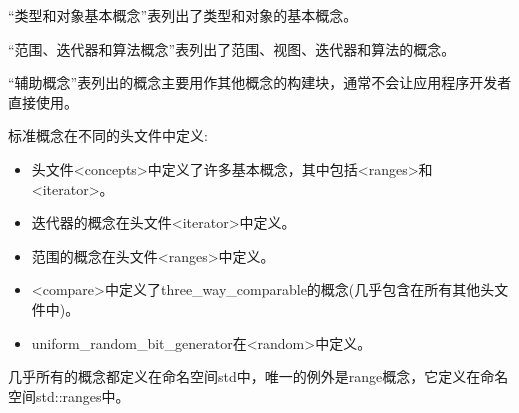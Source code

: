 
“类型和对象基本概念”表列出了类型和对象的基本概念。

“范围、迭代器和算法概念”表列出了范围、视图、迭代器和算法的概念。

“辅助概念”表列出的概念主要用作其他概念的构建块，通常不会让应用程序开发者直接使用。


标准概念在不同的头文件中定义:

\begin{itemize}
\item
头文件<concepts>中定义了许多基本概念，其中包括<ranges>和<iterator>。

\item
迭代器的概念在头文件<iterator>中定义。

\item
范围的概念在头文件<ranges>中定义。

\item
<compare>中定义了three\_way\_comparable的概念(几乎包含在所有其他头文件中)。

\item
uniform\_random\_bit\_generator在<random>中定义。
\end{itemize}

几乎所有的概念都定义在命名空间std中，唯一的例外是range概念，它定义在命名空间std::ranges中。

